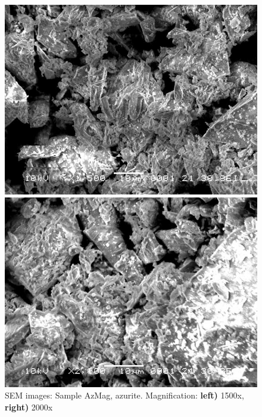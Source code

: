 \begin{figure}[H]
\centering
\begin{minipage}{.45\textwidth}
  \centering
  \includegraphics[width=\linewidth]{AzMag_x1500_5_160321}
\end{minipage}
\begin{minipage}{.45\textwidth}
  \centering
  \includegraphics[width=\linewidth]{AzMag_x2000_1_160321}
\end{minipage}
\caption[SEM images: Sample AzMag, azurite]{SEM images: Sample AzMag, azurite. Magnification: \textbf{left)} 1500x, \textbf{right)} 2000x}
\label{fig:azmag_sem_5}
\end{figure}



